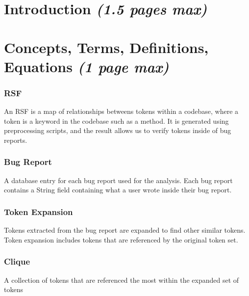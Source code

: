 \documentclass[12pt]{article}
\begin{document}
\hypertarget{introduction-1.5-pages-max}{%
\section{\texorpdfstring{Introduction \emph{(1.5 pages
max)}}{Introduction (1.5 pages max)}}\label{introduction-1.5-pages-max}}

\hypertarget{concepts-terms-definitions-equations-1-page-max}{%
\section{\texorpdfstring{Concepts, Terms, Definitions, Equations
\emph{(1 page
max)}}{Concepts, Terms, Definitions, Equations (1 page max)}}\label{concepts-terms-definitions-equations-1-page-max}}

\hypertarget{rsf}{%
\subsubsection{RSF}\label{rsf}}

An RSF is a map of relationships betweens tokens within a codebase,
where a token is a keyword in the codebase such as a method. It is
generated using preprocessing scripts, and the result allows us to
verify tokens inside of bug reports.

\hypertarget{bug-report}{%
\subsubsection{Bug Report}\label{bug-report}}

A database entry for each bug report used for the analysis. Each bug
report contains a String field containing what a user wrote inside their
bug report.

\hypertarget{token-expansion}{%
\subsubsection{Token Expansion}\label{token-expansion}}

Tokens extracted from the bug report are expanded to find other similar
tokens. Token expansion includes tokens that are referenced by the
original token set.

\hypertarget{clique}{%
\subsubsection{Clique}\label{clique}}

A collection of tokens that are referenced the most within the expanded
set of tokens
\end{document}

